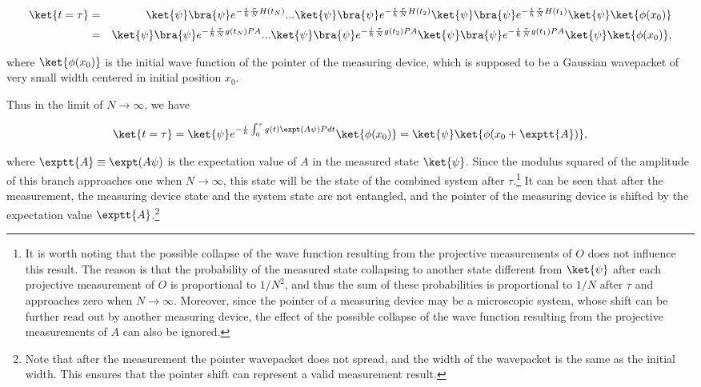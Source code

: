 \begin{eqnarray}
\ket{t=\tau} &=& \ket{\psi}\bra{\psi}e^{-{i\over\hbar}{\tau\over N}H(t_N)}... \ket{\psi}\bra{\psi}e^{-{i\over\hbar}{\tau\over N}H(t_2)}
\ket{\psi}\bra{\psi}e^{-{i\over\hbar}{\tau\over N}H(t_1)}\ket{\psi}\ket{\phi(x_0)}\nonumber \\ 
&=&\ket{\psi}\bra{\psi}e^{-{i\over\hbar}{\tau\over N}g(t_N)P A}... \ket{\psi}\bra{\psi}e^{-{i\over\hbar}{\tau\over N}g(t_2)P A}
\ket{\psi}\bra{\psi}e^{-{i\over\hbar}{\tau\over N}g(t_1)P A}\ket{\psi}\ket{\phi(x_0)},\nonumber \\
\label{}
\end{eqnarray}

\noindent where $\ket{\phi(x_0)}$ is the initial wave function of the pointer of the measuring device, which is supposed to be a Gaussian wavepacket of very small width centered in initial position $x_0$.

Thus in the limit of $N \rightarrow \infty$, we have

\begin{eqnarray}
\ket{t=\tau} = \ket{\psi}e^{-{i\over\hbar}\int_{0}^{\tau}g(t)\expt(A{\psi})Pdt}\ket{\phi(x_0)}
= \ket{\psi}\ket{\phi(x_0+\exptt{A})},
\label{PMZ}
\end{eqnarray}

\noindent where $\exptt{A} \equiv \expt(A{\psi})$ is the expectation value of $A$ in the measured state $\ket{\psi}$. Since the modulus squared of the amplitude of this branch approaches one when $N \rightarrow \infty$, this state will be the state of the combined system after $\tau$.\footnote{It is worth noting that the possible collapse of the wave function resulting from the projective measurements of $O$ does not influence this result. The reason is that the probability of the measured state collapsing to another state different from $\ket{\psi}$ after each projective measurement of $O$ is proportional to $1/N^2$, and thus the sum of these probabilities is proportional to $1/N$ after $\tau$ and approaches zero when $N \rightarrow \infty$. Moreover, since the pointer of a  measuring device may be a microscopic system, whose shift can be further read out by another measuring device, the effect of the possible collapse of the wave function resulting from the projective measurements of $A$ can also be ignored.} It can be seen that after the measurement, the measuring device state and the system state are not entangled, and the pointer of the measuring device is shifted by the expectation value $\exptt{A}$.\footnote{Note that after the measurement the pointer wavepacket does not spread, and the width of the wavepacket is the same as the initial width. This ensures that the pointer shift can represent a valid measurement result.} 

